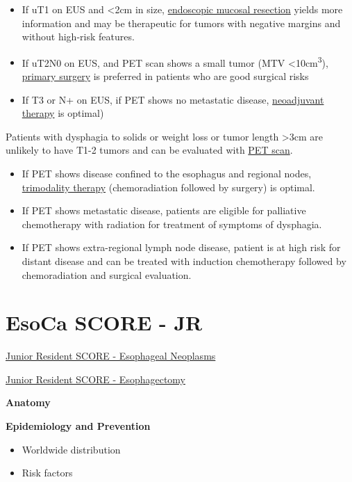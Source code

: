 \documentclass[
  letterpaper,
]{scrbook}
\providecommand{\tightlist}{%
  \setlength{\itemsep}{0pt}\setlength{\parskip}{0pt}}
\begin{document}
\begin{itemize}
\tightlist
\item
  If uT1 on EUS and \textless2cm in size, \hyperref[emr]{endoscopic
  mucosal resection} yields more information and may be therapeutic for
  tumors with negative margins and without high-risk features.
\item
  If uT2N0 on EUS, and PET scan shows a small tumor (MTV
  \textless10cm\textsuperscript{3}), \hyperref[primary_surgery]{primary
  surgery} is preferred in patients who are good surgical risks
\item
  If T3 or N+ on EUS, if PET shows no metastatic disease,
  \hyperref[trimodality]{neoadjuvant therapy} is optimal)
\end{itemize}

Patients with dysphagia to solids or weight loss or tumor length
\textgreater3cm are unlikely to have T1-2 tumors and can be evaluated
with \hyperref[pet]{PET scan}.

\begin{itemize}
\tightlist
\item
  If PET shows disease confined to the esophagus and regional nodes,
  \hyperref[trimodality]{trimodality therapy} (chemoradiation followed
  by surgery) is optimal.
\item
  If PET shows metastatic disease, patients are eligible for palliative
  chemotherapy with radiation for treatment of symptoms of dysphagia.
\item
  If PET shows extra-regional lymph node disease, patient is at high
  risk for distant disease and can be treated with induction
  chemotherapy followed by chemoradiation and surgical evaluation.
\end{itemize}

\chapter{EsoCa SCORE - JR}\label{EsoObjJB}

\href{https://www.surgicalcore.org/modulecontent.aspx?id=1000534}{Junior
Resident SCORE - Esophageal Neoplasms}

\href{https://www.surgicalcore.org/modulecontent.aspx?id=164703}{Junior
Resident SCORE - Esophagectomy}

\textbf{Anatomy}

\textbf{Epidemiology and Prevention}

\begin{itemize}
\tightlist
\item
  Worldwide distribution
\item
  Risk factors
\end{itemize}
\end{document}
